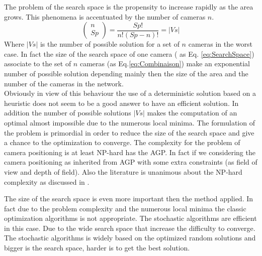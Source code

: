 The problem of the search space is the propensity to increase rapidly as the area grows. This phenomena is accentuated by the number of cameras $n$.
 \begin{equation} \label{eq:Combinaison}
 \begin{pmatrix} n \\ Sp \end{pmatrix}  = \frac{Sp!}{n!(Sp-n)!} = |Vs|
 \end{equation} 
 Where $|Vs|$ is the number of possible solution for a set of $n$ cameras in the worst case. %
 In fact the size of the search space of one camera ( as Eq. \ref{eq:SearchSpace}) associate to the set of $n$ cameras (as Eq.\ref{eq:Combinaison}) make an exponential number of possible solution depending mainly then the size of the area and the number of the cameras in the network. \\
 Obviously in view of this behaviour the use of a deterministic solution based on a heuristic does not seem to be a good answer to have an efficient solution. In addition the number of possible solutions $|Vs|$ makes the computation of an optimal almost impossible due to the numerous local minima. 
 The formulation of the problem is primordial in order to reduce the size of the search space and give a chance to the optimization to converge.
 The complexity for the problem of camera positioning is  at least  NP-hard has  the AGP. In fact if we considering the  camera positioning  as inherited  from AGP  with some extra constraints (as field of view and depth of field). Also the literature is unanimous about the  NP-hard complexity as discussed in  \citep{43*erdem2006,53*packer2008,62*vijayan1991,22*zhao2008,49*ning1994}. %

The size of the search space is even more important then the method applied. In fact due to the  problem complexity   and  the numerous local minima the classic optimization algorithms  is not  appropriate. The stochastic algorithms  are efficient in this case.  Due to the wide  search space that increase the difficulty to converge. The stochastic algorithms is  widely based on the optimized random solutions and bigger is the  search space,  harder is to get the best solution. 






 
